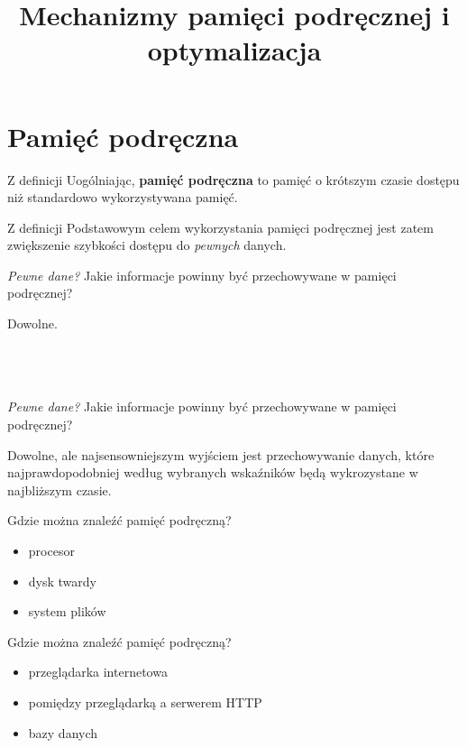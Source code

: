 

\title{Mechanizmy pamięci podręcznej i optymalizacja}



\section{Pamięć podręczna}

\begin{frame}{Z definicji}
	Uogólniając, \textbf{pamięć podręczna} to pamięć o krótszym czasie dostępu niż standardowo wykorzystywana pamięć.
\end{frame}

\begin{frame}{Z definicji}
	Podstawowym celem wykorzystania pamięci podręcznej jest zatem zwiększenie szybkości dostępu do \emph{pewnych} danych.
\end{frame}

\begin{frame}{\emph{Pewne dane?}}
	Jakie informacje powinny być przechowywane w pamięci podręcznej?
	
	Dowolne. \ \\ \ \\ \ \\ \ \\
\end{frame}

\begin{frame}{\emph{Pewne dane?}}
	Jakie informacje powinny być przechowywane w pamięci podręcznej?
	
	Dowolne, ale najsensowniejszym wyjściem jest przechowywanie danych, które najprawdopodobniej według wybranych wskaźników będą wykrozystane w najbliższym czasie.
\end{frame}

\begin{frame}{Gdzie można znaleźć pamięć podręczną?}
	\begin{itemize}
		\item procesor
		\item dysk twardy
		\item system plików
	\end{itemize}
\end{frame}

\begin{frame}{Gdzie można znaleźć pamięć podręczną?}
	\begin{itemize}
		\item przeglądarka internetowa
		\item pomiędzy przeglądarką a serwerem HTTP
		\item bazy danych
	\end{itemize}
\end{frame}


